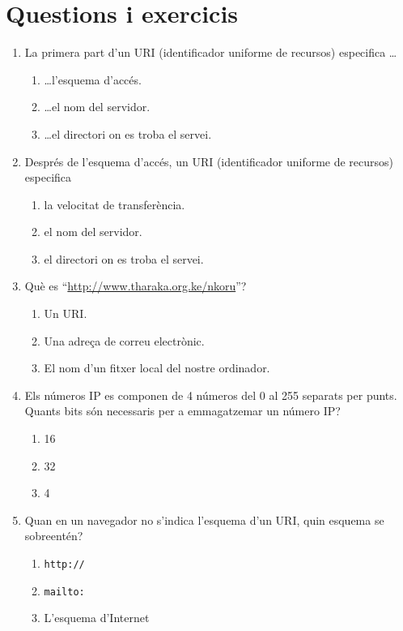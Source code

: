 \section{Questions i exercicis}
\begin{enumerate}

\item La primera part d'un URI (identificador uniforme de recursos)
  especifica \ldots
  \begin{enumerate}
  \item \ldots l'esquema d'accés.
  \item \ldots el nom del servidor.
  \item \ldots el directori on es troba el servei.
  \end{enumerate}

\item Després de l'esquema d'accés, un URI (identificador uniforme de
  recursos) especifica
  \begin{enumerate}
  \item la velocitat de transferència.
  \item el nom del servidor.
  \item el directori on es troba el servei.
  \end{enumerate}

\item Què es ``\url{http://www.tharaka.org.ke/nkoru}''?
  \begin{enumerate}
  \item Un URI.
  \item Una adreça de correu electrònic.
  \item El nom d'un fitxer local del nostre ordinador.
  \end{enumerate}

\item Els números IP es componen de 4 números del 0 al 255 separats
  per punts. Quants bits són necessaris per a emmagatzemar un número
  IP?
  \begin{enumerate}
  \item 16
  \item 32
  \item 4
  \end{enumerate}

\item Quan en un navegador no s'indica l'esquema d'un URI, quin
  esquema se sobreentén?  
  \begin{enumerate}
  \item \texttt{http://}
  \item \texttt{mailto:}
  \item L'esquema d'Internet
  \end{enumerate}


\end{enumerate}
